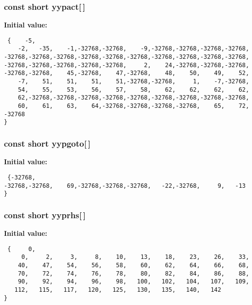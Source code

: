 \subsubsection{\setlength{\rightskip}{0pt plus 5cm}const short yypact[$\,$]\hspace{0.3cm}{\tt  [static]}}\label{vcd__parser_8c_a92}


{\bf Initial value:}

\footnotesize\begin{verbatim} {    -5,
    -2,   -35,    -1,-32768,-32768,    -9,-32768,-32768,-32768,-32768,
-32768,-32768,-32768,-32768,-32768,-32768,-32768,-32768,-32768,-32768,
-32768,-32768,-32768,-32768,-32768,     2,    24,-32768,-32768,-32768,
-32768,-32768,    45,-32768,    47,-32768,    48,    50,    49,    52,
    -7,    51,    51,    51,    51,-32768,-32768,     1,    -7,-32768,
    54,    55,    53,    56,    57,    58,    62,    62,    62,    62,
    62,-32768,-32768,-32768,-32768,-32768,-32768,-32768,-32768,-32768,
    60,    61,    63,    64,-32768,-32768,-32768,-32768,    65,    72,
-32768
}\end{verbatim}\normalsize 
{}
\subsubsection{\setlength{\rightskip}{0pt plus 5cm}const short yypgoto[$\,$]\hspace{0.3cm}{\tt  [static]}}\label{vcd__parser_8c_a93}


{\bf Initial value:}

\footnotesize\begin{verbatim} {-32768,
-32768,-32768,    69,-32768,-32768,-32768,   -22,-32768,     9,   -13
}\end{verbatim}\normalsize 
{}
\subsubsection{\setlength{\rightskip}{0pt plus 5cm}const short yyprhs[$\,$]\hspace{0.3cm}{\tt  [static]}}\label{vcd__parser_8c_a84}


{\bf Initial value:}

\footnotesize\begin{verbatim} {     0,
     0,     2,     3,     8,    10,    13,    18,    23,    26,    33,
    40,    47,    54,    56,    58,    60,    62,    64,    66,    68,
    70,    72,    74,    76,    78,    80,    82,    84,    86,    88,
    90,    92,    94,    96,    98,   100,   102,   104,   107,   109,
   112,   115,   117,   120,   125,   130,   135,   140,   142
}\end{verbatim}\normalsize 
{}
